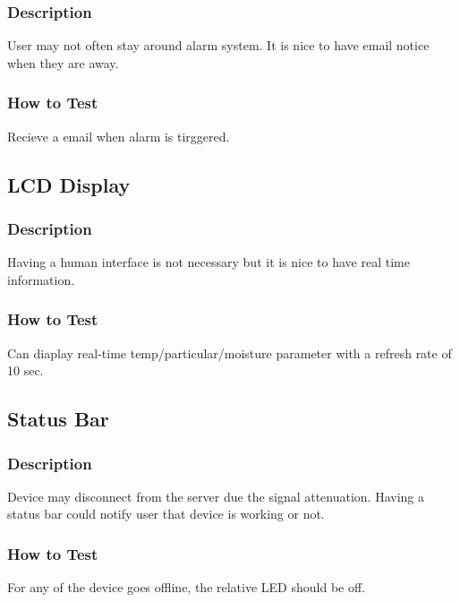 \documentclass[letterpaper,12pt,notitlepage]{article}
\begin{document}
		\subsubsection{Description}
			\par User may not often stay around alarm system. It is nice to have email notice when they are away. 
		\subsubsection{How to Test}
			\par Recieve a email when alarm is tirggered. 


	\subsection{LCD Display}
		\subsubsection{Description}
			\par Having a human interface is not necessary but it is nice to have real time information. 
		\subsubsection{How to Test}
			\par Can diaplay real-time temp/particular/moisture parameter with a refresh rate of 10 sec. 


	\subsection{Status Bar}
		\subsubsection{Description}
			\par Device may disconnect from the server due the signal attenuation. Having a status bar could 
			notify user that device is working or not. 
		\subsubsection{How to Test}
			\par For any of the device goes offline, the relative LED should be off. 
\end{document}
